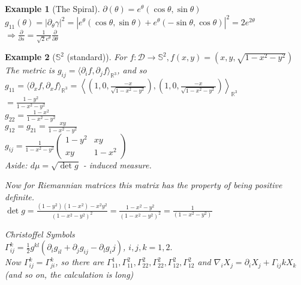 \documentclass[11pt]{article}
\theoremstyle{thm}
\newtheorem{example}{Example}
\newcommand{\vpi}[0]{\medskip \par \noindent}
\begin{document}
\begin{example}[The Spiral]
	$\partial(\theta)=e^{\theta}(\cos{\theta}, \sin{\theta})$\\[1em]
	$g_{11}(\theta)=|\partial_\theta \gamma|^2 =|e^\theta (\cos{\theta}, \sin{\theta})+e^\theta (-\sin{\theta}, \cos{\theta})|^2 = 2e^{2\theta}$\\[0.5em]
	$\Rightarrow \displaystyle\frac{\partial}{\partial s}=\displaystyle\frac{1}{\sqrt{2} e^\theta}\displaystyle\frac{\partial}{\partial \theta}$\\
\end{example}
\newpage
\begin{example}[$\mathbb{S}^2$ (standard)]
For $f: \mathscr{D} \rightarrow \mathbb{S}^2, f(x,y)=(x,y,\sqrt{1-x^2-y^2})$\\[1em]
The metric is $g_{ij}=\big\langle \partial_i f, \partial_j f \big\rangle_{\mathbb{R}^3}$, and so\\
$g_{11}=\big\langle \partial_x f, \partial_x f \big\rangle_{\mathbb{R}^3} = \left\langle \left(1, 0, \displaystyle\frac{-x}{\sqrt{1-x^2-y^2}} \right) , \left(1, 0, \displaystyle\frac{-x}{\sqrt{1-x^2-y^2}} \right) \right\rangle_{\mathbb{R}^3} $\\
$= \displaystyle\frac{1-y^2}{1-x^2-y^2}$\\[0.5em]
$g_{22} = \displaystyle\frac{1-x^2}{1-x^2-y^2}$\\[0.5em] $g_{12}=g_{21}=\displaystyle\frac{xy}{1-x^2-y^2}$\\[1em]
$g_{ij}=\displaystyle\frac{1}{1-x^2-y^2} \begin{pmatrix}
	1-y^2       & xy \\
	xy       & 1-x^2
\end{pmatrix}$\\[1em]
Aside: $d \mu = \sqrt{\det{g}}$ - induced measure.\\
\vpi
Now for Riemannian matrices this matrix has the property of being positive definite.\\[1em]
$\det{g}=\displaystyle\frac{(1-y^2)(1-x^2)-x^2 y^2}{(1-x^2-y^2)^2}=\displaystyle\frac{1-x^2-y^2}{(1-x^2-y^2)^2}=\displaystyle\frac{1}{(1-x^2-y^2)}$\\
\vpi
\textit{Christoffel Symbols}\\
$\Gamma_{ij}^k = \displaystyle\frac{1}{2}g^{kl}(\partial_i g_{il}+\partial_j g_{ij} - \partial_l g_ij)$, $i,j,k = 1,2.$\\[1em]
Now $\Gamma_{ij}^{k}=\Gamma_{ji}^{k}$, so there are $\Gamma_{11}^{1}, \Gamma_{11}^{2}, \Gamma_{22}^{2}, \Gamma_{22}^{2}, \Gamma_{12}^{2}, \Gamma_{12}^{2}$ and
$\nabla_i X_j = \partial_i X_j + \Gamma_{ij}{k}X_k$\\
(and so on, the calculation is long)
\end{example}
\end{document}
